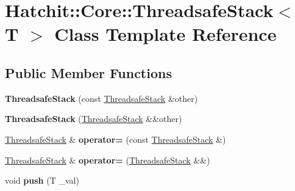 \hypertarget{classHatchit_1_1Core_1_1ThreadsafeStack}{}\section{Hatchit\+:\+:Core\+:\+:Threadsafe\+Stack$<$ T $>$ Class Template Reference}
\label{classHatchit_1_1Core_1_1ThreadsafeStack}
\subsection*{Public Member Functions}
\begin{DoxyCompactItemize}
\item 
{\bfseries Threadsafe\+Stack} (const \hyperlink{classHatchit_1_1Core_1_1ThreadsafeStack}{Threadsafe\+Stack} \&other)\hypertarget{classHatchit_1_1Core_1_1ThreadsafeStack_a5c1e235499e48df8ae7b8568d9c0e5db}{}\label{classHatchit_1_1Core_1_1ThreadsafeStack_a5c1e235499e48df8ae7b8568d9c0e5db}

\item 
{\bfseries Threadsafe\+Stack} (\hyperlink{classHatchit_1_1Core_1_1ThreadsafeStack}{Threadsafe\+Stack} \&\&other)\hypertarget{classHatchit_1_1Core_1_1ThreadsafeStack_ae0ae8128839367b9d320b59d5396c037}{}\label{classHatchit_1_1Core_1_1ThreadsafeStack_ae0ae8128839367b9d320b59d5396c037}

\item 
\hyperlink{classHatchit_1_1Core_1_1ThreadsafeStack}{Threadsafe\+Stack} \& {\bfseries operator=} (const \hyperlink{classHatchit_1_1Core_1_1ThreadsafeStack}{Threadsafe\+Stack} \&)\hypertarget{classHatchit_1_1Core_1_1ThreadsafeStack_a5b86067376dc2a1b1ffad3ac4793a7da}{}\label{classHatchit_1_1Core_1_1ThreadsafeStack_a5b86067376dc2a1b1ffad3ac4793a7da}

\item 
\hyperlink{classHatchit_1_1Core_1_1ThreadsafeStack}{Threadsafe\+Stack} \& {\bfseries operator=} (\hyperlink{classHatchit_1_1Core_1_1ThreadsafeStack}{Threadsafe\+Stack} \&\&)\hypertarget{classHatchit_1_1Core_1_1ThreadsafeStack_a3a9220aa5dfa4ca704957beab9cd7d0d}{}\label{classHatchit_1_1Core_1_1ThreadsafeStack_a3a9220aa5dfa4ca704957beab9cd7d0d}

\item 
void {\bfseries push} (T \+\_\+val)\hypertarget{classHatchit_1_1Core_1_1ThreadsafeStack_a167c1fb0a36da427551d8f0e0ed62e7d}{}\label{classHatchit_1_1Core_1_1ThreadsafeStack_a167c1fb0a36da427551d8f0e0ed62e7d}


\end{DoxyCompactItemize}
